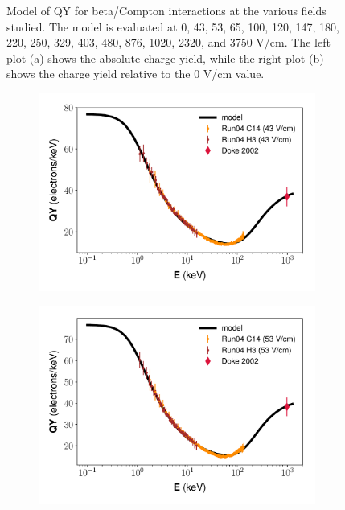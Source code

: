 \begin{figure}[!h]
\begin{subfigure}{0.5\linewidth}
\caption{}
\end{subfigure}
\caption{Model of QY for beta/Compton interactions at the various fields studied. The model is evaluated at 0, 43, 53, 65, 100, 120, 147, 180, 220, 250, 329, 403, 480, 876, 1020, 2320, and 3750 V/cm. The left plot (a) shows the absolute charge yield, while the right plot (b) shows the charge yield relative to the 0 V/cm value. }
\label{fig:betamod_fieldvar}
\end{figure}



\begin{figure}[!h]
\centering
\begin{subfigure}{0.5\linewidth}
\includegraphics[width=\linewidth]{Figures/Yields_fit_new/NEST_fit_43Vcm_new.pdf}
\caption{}
\end{subfigure}%
\begin{subfigure}{0.5\linewidth}
\includegraphics[width=\linewidth]{Figures/Yields_fit_new/NEST_fit_53Vcm_new.pdf}

\end{subfigure}
\end{figure}
